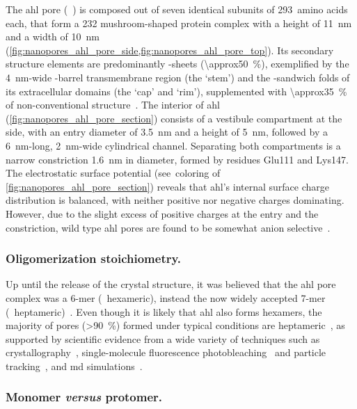 The \gls{ahl} pore (~\cite{Song-1996}) is composed out of seven identical subunits of 293~amino
acids each, that form a \SI{232}{\kDa} mushroom-shaped protein complex with a height of \SI{11}{\nm} and a
width of \SI{10}{\nm} (\cref{fig:nanopores_ahl_pore_side,fig:nanopores_ahl_pore_top}). Its secondary structure
elements are predominantly \tb-sheets (\SI{\approx50}{\percent}), exemplified by the \SI{4}{\nm}-wide
\tb-barrel transmembrane region (the `stem') and the \tb-sandwich folds of its extracellular domains (the
`cap' and `rim'), supplemented with \SI{\approx35}{\percent} of non-conventional structure~\cite{Song-1996}.
The interior of \gls{ahl} (\cref{fig:nanopores_ahl_pore_section}) consists of a vestibule compartment at the
\cisi{} side, with an entry diameter of \SI{3.5}{\nm} and a height of \SI{5}{\nm}, followed by a
\SI{6}{\nm}-long, \SI{2}{\nm}-wide cylindrical channel. Separating both compartments is a narrow constriction
\SI{1.6}{\nm} in diameter, formed by residues Glu111 and Lys147. The electrostatic surface potential
(see~coloring of \cref{fig:nanopores_ahl_pore_section}) reveals that \gls{ahl}'s internal surface charge
distribution is balanced, with neither positive nor negative charges dominating. However, due to the slight
excess of positive charges at the \cisi{} entry and the constriction, wild type \gls{ahl} pores are found to
be somewhat anion selective~\cite{Menestrina-1986}.


\subsubsection{Oligomerization stoichiometry.}
%

Up until the release of the crystal structure, it was believed that the \gls{ahl} pore complex was a 6-mer
(\ie~hexameric), instead the now widely accepted 7-mer (\ie~heptameric)~\cite{Song-1996}. Even though it is
likely that \gls{ahl} also forms hexamers, the majority of pores (\SI{>90}{\percent}) formed under typical
conditions are heptameric~\cite{Menestrina-1986}, as supported by scientific evidence from a wide variety of
techniques such as crystallography~\cite{Song-1996,Galdiero-2004}, single-molecule fluorescence
photobleaching~\cite{Das-2007} and particle tracking~\cite{Thompson-2011}, and \gls{md}
simulations~\cite{Aksimentiev-2005,Bhattacharya-2011,Basdevant-2019}. 


\subsubsection{Monomer \textit{versus} protomer.}
%

